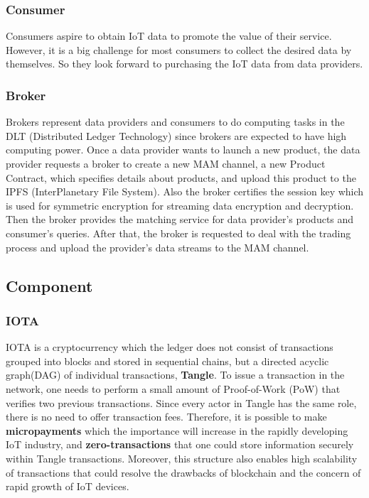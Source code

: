 \documentclass[journal,a4paper]{IEEEtran}
\begin{document}
\subsubsection{Consumer}
Consumers aspire to obtain IoT data to promote the value of their service. However, it is a big challenge for most consumers to collect the desired data by themselves. So they look forward to purchasing the IoT data from data providers.

\subsubsection{Broker}
Brokers represent data providers and consumers to do computing tasks in the DLT (Distributed Ledger Technology) since brokers are expected to have high computing power. Once a data provider wants to launch a new product, the data provider requests a broker to create a new MAM channel, a new Product Contract, which specifies details about products, and upload this product to the IPFS (InterPlanetary File System)\cite{IPFS}. Also the broker certifies the session key which is used for symmetric encryption for streaming data encryption and decryption. Then the broker provides the matching service for data provider’s products and consumer’s queries. After that, the broker is requested to deal with the trading process and upload the provider’s data streams to the MAM channel.

\subsection{Component}
\subsubsection{IOTA}
IOTA\cite{IOTAwhitepaper} is a cryptocurrency which the ledger does not consist of transactions grouped into blocks and stored in sequential chains, but a directed acyclic graph(DAG) of individual transactions, \textbf{Tangle}. To issue a transaction in the network, one needs to perform a small amount of Proof-of-Work (PoW) that verifies two previous transactions. Since every actor in Tangle has the same role, there is no need to offer transaction fees. Therefore, it is possible to make \textbf{micropayments} which the importance will increase in the rapidly developing IoT industry, and \textbf{zero-transactions} that one could store information securely within Tangle transactions. Moreover, this structure also enables high scalability of transactions that could resolve the drawbacks of blockchain and the concern of rapid growth of IoT devices.
\end{document}
